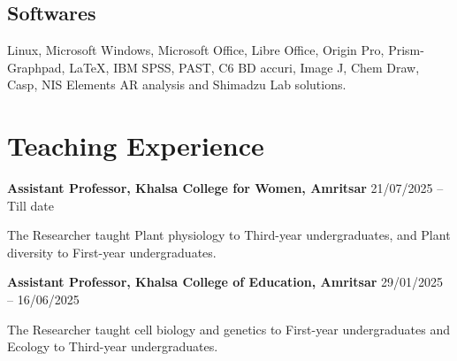 \documentclass[11pt,a4paper]{article}
\begin{document}
\subsection*{Softwares}
Linux, Microsoft Windows, Microsoft Office, Libre Office, Origin Pro, Prism-Graphpad, \LaTeX{}, IBM SPSS, PAST, C6 BD accuri, Image J, Chem Draw, Casp, NIS Elements AR analysis and Shimadzu Lab solutions.

\vspace{0.5cm}

\section*{Teaching Experience}

\textbf{Assistant Professor, Khalsa College for Women, Amritsar} \hfill 21/07/2025 -- Till date

The Researcher taught Plant physiology to Third-year undergraduates, and Plant diversity to First-year undergraduates.

\textbf{Assistant Professor, Khalsa College of Education, Amritsar} \hfill 29/01/2025 -- 16/06/2025

The Researcher taught cell biology and genetics to First-year undergraduates and Ecology to Third-year undergraduates.
\end{document}
